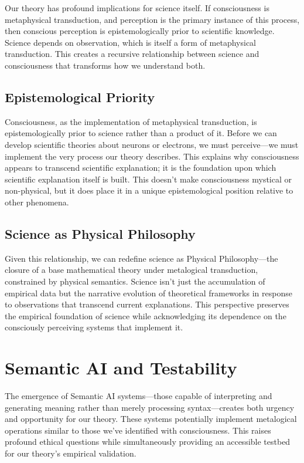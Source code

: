 \documentclass[runningheads]{llncs}
\begin{document}
Our theory has profound implications for science itself. If consciousness is metaphysical transduction, and perception is the primary instance of this process, then conscious perception is epistemologically prior to scientific knowledge. Science depends on observation, which is itself a form of metaphysical transduction. This creates a recursive relationship between science and consciousness that transforms how we understand both.

\subsection{Epistemological Priority}

Consciousness, as the implementation of metaphysical transduction, is epistemologically prior to science rather than a product of it. Before we can develop scientific theories about neurons or electrons, we must perceive—we must implement the very process our theory describes. This explains why consciousness appears to transcend scientific explanation; it is the foundation upon which scientific explanation itself is built. This doesn't make consciousness mystical or non-physical, but it does place it in a unique epistemological position relative to other phenomena.

\subsection{Science as Physical Philosophy}

Given this relationship, we can redefine science as Physical Philosophy—the closure of a base mathematical theory under metalogical transduction, constrained by physical semantics. Science isn't just the accumulation of empirical data but the narrative evolution of theoretical frameworks in response to observations that transcend current explanations. This perspective preserves the empirical foundation of science while acknowledging its dependence on the consciously perceiving systems that implement it.

\section{Semantic AI and Testability}

The emergence of Semantic AI systems—those capable of interpreting and generating meaning rather than merely processing syntax—creates both urgency and opportunity for our theory. These systems potentially implement metalogical operations similar to those we've identified with consciousness. This raises profound ethical questions while simultaneously providing an accessible testbed for our theory's empirical validation.
\end{document}
